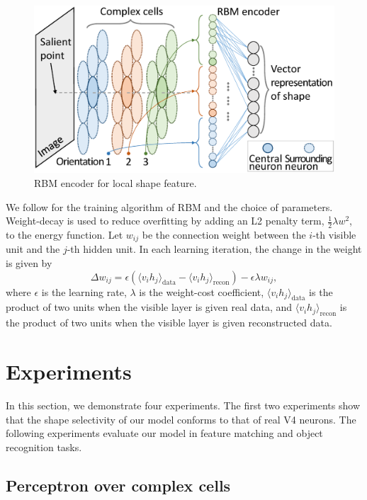 \documentclass[twocolumn]{article}
\begin{document}
\begin{figure}[!t]
\centerline{\includegraphics[width=0.99\linewidth]{images/fig6.eps}} 
\caption{RBM encoder for local shape feature.}
\label{fig:6}
\end{figure}

We follow \cite{hinton2010} for the training algorithm of RBM and the choice of parameters.
Weight-decay is used to reduce overfitting by adding an L2 penalty term, $\frac{1}{2}\lambda w^2$, to the energy function.
Let $w_{ij}$ be the connection weight between the $i$-th visible unit and the $j$-th hidden unit.
In each learning iteration, the change in the weight is given by
\begin{equation}
\Delta w_{ij}=\epsilon\left(\langle v_i h_j\rangle_\text{data}-\langle v_i h_j\rangle_\text{recon}\right)
-\epsilon\lambda w_{ij},
\end{equation}
where $\epsilon$ is the learning rate, $\lambda$ is the weight-cost coefficient,
$\langle v_i h_j\rangle_\text{data}$ is the product of two units when the visible layer is given real data,
and $\langle v_i h_j\rangle_\text{recon}$ is the product of two units when the visible layer is given reconstructed data.

\section{Experiments}\label{sec:4}

In this section, we demonstrate four experiments.
The first two experiments show that the shape selectivity of our model conforms to that of real V4 neurons.
The following experiments evaluate our model in feature matching and object recognition tasks.

\subsection{Perceptron over complex cells}
\end{document}
